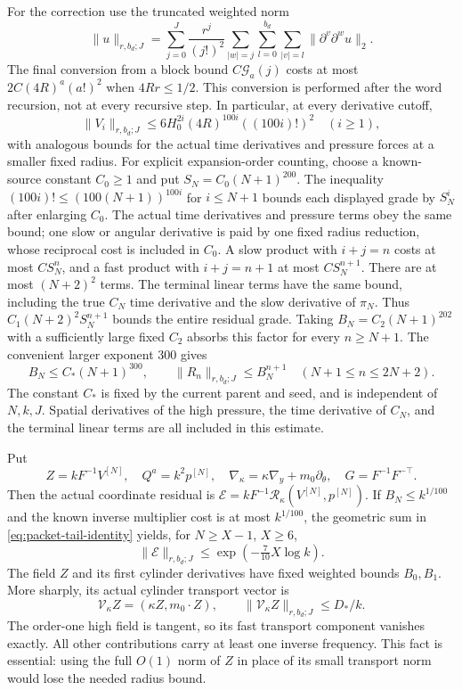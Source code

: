 For the correction use the truncated weighted norm
\[
 \|u\|_{r,b_d;J}
 =\sum_{j=0}^J\frac{r^j}{(j!)^2}
     \sum_{|w|=j}\sum_{l=0}^{b_d}\sum_{|v|=l}\|\partial^v\partial^wu\|_2.
\]
The final conversion from a block bound
$C\mathcal G_a(j)$ costs at most $2C(4R)^a(a!)^2$ when $4Rr\le1/2$.
This conversion is performed after the word recursion, not at every
recursive step. In particular, at every derivative cutoff,
\[
 \|V_i\|_{r,b_d;J}\le
  6H_0^{2i}(4R)^{100i}((100i)!)^2\quad(i\ge1),
\]
with analogous bounds for the actual time derivatives and pressure
forces at a smaller fixed radius. For explicit expansion-order counting, choose a known-source constant
$C_0\ge1$ and put $S_N=C_0(N+1)^{200}$. The inequality
$(100i)!\le(100(N+1))^{100i}$ for $i\le N+1$ bounds each displayed
grade by $S_N^i$ after enlarging $C_0$. The actual time derivatives
and pressure terms obey the same bound; one slow or angular derivative
is paid by one fixed radius reduction, whose reciprocal cost is included
in $C_0$. A slow product with $i+j=n$ costs at most $C S_N^n$, and a
fast product with $i+j=n+1$ at most $C S_N^{n+1}$. There are at most
$(N+2)^2$ terms. The terminal linear terms have the same bound, including
the true $C_N$ time derivative and the slow derivative of $\pi_N$.
Thus $C_1(N+2)^2S_N^{n+1}$ bounds the entire residual grade. Taking
$B_N=C_2(N+1)^{202}$ with a sufficiently large fixed $C_2$ absorbs this
factor for every $n\ge N+1$. The convenient larger exponent $300$ gives
\begin{equation}\label{eq:packet-tail-base}
 B_N\le C_*(N+1)^{300},\qquad
 \|R_n\|_{r,b_d;J}\le B_N^{n+1}\quad(N+1\le n\le2N+2).
\end{equation}
The constant $C_*$ is fixed by the current parent and seed, and is
independent of $N,k,J$. Spatial derivatives of the high pressure, the
time derivative of $C_N$, and the terminal linear terms are all included
in this estimate.

Put
\begin{equation}\label{eq:packet-coordinate-change}
 Z=kF^{-1}V^{[N]},\quad Q^a=k^2p^{[N]},\quad
 \nabla_\kappa=\kappa\nabla_y+m_0\partial_\theta,
 \quad G=F^{-1}F^{-\top}.
\end{equation}
Then the actual coordinate residual is $\mathcal E=kF^{-1}\mathcal
R_\kappa(V^{[N]},p^{[N]})$. If $B_N\le k^{1/100}$ and the known inverse
multiplier cost is at most $k^{1/100}$, the geometric sum in
\eqref{eq:packet-tail-identity} yields, for $N\ge X-1$, $X\ge6$,
\begin{equation}\label{eq:packet-small-residual}
 \|\mathcal E\|_{r,b_d;J}
       \le \exp(-\tfrac7{10}X\log k).
\end{equation}
The field $Z$ and its first cylinder derivatives have fixed weighted
bounds $B_0,B_1$. More sharply, its actual cylinder transport vector is
\[
 \mathcal V_\kappa Z=(\kappa Z,m_0\cdot Z),
 \qquad \|\mathcal V_\kappa Z\|_{r,b_d;J}\le D_*/k.
\]
The order-one high field is tangent, so its fast transport component
vanishes exactly. All other contributions carry at least one inverse
frequency. This fact is essential: using the full $O(1)$ norm of $Z$
in place of its small transport norm would lose the needed radius bound.

